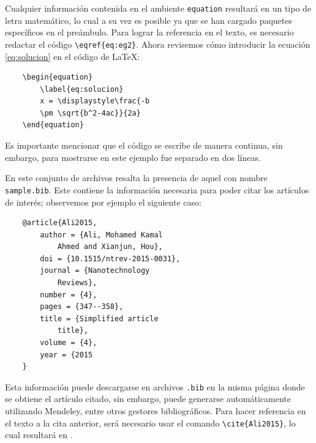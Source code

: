 \documentclass[fleqn,10pt]{SelfArx} %
\begin{document}
\noindent Cualquier información contenida en el ambiente \texttt{equation} resultará en un tipo de letra matemático, lo cual a su vez es posible ya que se han cargado paquetes específicos en el preámbulo. Para lograr la referencia en el texto, es necesario redactar el código \verb|\eqref{eq:eg2}|. Ahora revisemos cómo introducir la ecuación \eqref{eq:solucion} en el código de \LaTeX:

\begin{verbatim}
    \begin{equation}
        \label{eq:solucion}
        x = \displaystyle\frac{-b 
        \pm \sqrt{b^2-4ac}}{2a}
    \end{equation}
\end{verbatim}

\noindent Es importante mencionar que el código se escribe de manera continua, sin embargo, para mostrarse en este ejemplo fue separado en dos líneas.

En este conjunto de archivos resalta la presencia de aquel con nombre \texttt{sample.bib}. Este contiene la información necesaria para poder citar los artículos de interés; observemos por ejemplo el siguiente caso:

\begin{verbatim}
    @article{Ali2015,
        author = {Ali, Mohamed Kamal 
            Ahmed and Xianjun, Hou},
        doi = {10.1515/ntrev-2015-0031},
        journal = {Nanotechnology 
            Reviews},
        number = {4},
        pages = {347--358},
        title = {Simplified article
            title},
        volume = {4},
        year = {2015
    }
\end{verbatim}

Esta información puede descargarse en archivos \texttt{.bib} en la misma página donde se obtiene el artículo citado, sin embargo, puede generarse automáticamente utilizando Mendeley, entre otros gestores bibliográficos. Para hacer referencia en el texto a la cita anterior, será necesario usar el comando \verb|\cite{Ali2015}|, lo cual resultará en \cite{Ali2015}.%
\end{document}
